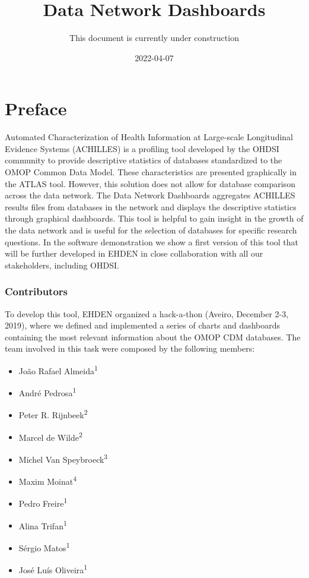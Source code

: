 \documentclass[
]{book}
\title{Data Network Dashboards}
\author{This document is currently under construction}
\date{2022-04-07}
\providecommand{\tightlist}{%
  \setlength{\itemsep}{0pt}\setlength{\parskip}{0pt}}
\begin{document}
\maketitle

{
\setcounter{tocdepth}{1}
\tableofcontents
}
\hypertarget{preface}{%
\chapter{Preface}\label{preface}}

Automated Characterization of Health Information at Large-scale Longitudinal Evidence Systems (ACHILLES) is a profiling tool developed by the OHDSI community to provide descriptive statistics of databases standardized to the OMOP Common Data Model. These characteristics are presented graphically in the ATLAS tool. However, this solution does not allow for database comparison across the data network. The Data Network Dashboards aggregates ACHILLES results files from databases in the network and displays the descriptive statistics through graphical dashboards. This tool is helpful to gain insight in the growth of the data network and is useful for the selection of databases for specific research questions. In the software demonstration we show a first version of this tool that will be further developed in EHDEN in close collaboration with all our stakeholders, including OHDSI.

\hypertarget{contributors}{%
\subsection*{Contributors}\label{contributors}}

To develop this tool, EHDEN organized a hack-a-thon (Aveiro, December 2-3, 2019), where we defined and implemented a series of charts and dashboards containing the most relevant information about the OMOP CDM databases. The team involved in this task were composed by the following members:

\begin{itemize}
\tightlist
\item
  João Rafael Almeida\textsuperscript{1}
\item
  André Pedrosa\textsuperscript{1}
\item
  Peter R. Rijnbeek\textsuperscript{2}
\item
  Marcel de Wilde\textsuperscript{2}
\item
  Michel Van Speybroeck\textsuperscript{3}
\item
  Maxim Moinat\textsuperscript{4}
\item
  Pedro Freire\textsuperscript{1}
\item
  Alina Trifan\textsuperscript{1}
\item
  Sérgio Matos\textsuperscript{1}
\item
  José Luís Oliveira\textsuperscript{1}
\end{itemize}
\end{document}
